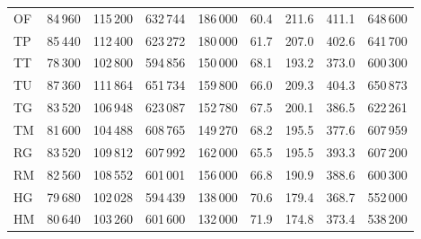 \begin{minipage}{\textwidth}
\begin{tabular*}{\textwidth}{@{\extracolsep{\fill}}lrrrrrrrr@{}}
OF & 84\,960 & 115\,200 & 632\,744 & 186\,000 & 60.4 & 211.6 & 411.1 & 648\,600\\
TP & 85\,440 & 112\,400 & 623\,272 & 180\,000 & 61.7 & 207.0 & 402.6 & 641\,700\\
TT & 78\,300 & 102\,800 & 594\,856 & 150\,000 & 68.1 & 193.2 & 373.0 & 600\,300\\
TU & 87\,360 & 111\,864 & 651\,734 & 159\,800 & 66.0 & 209.3 & 404.3 & 650\,873\\
TG & 83\,520 & 106\,948 & 623\,087 & 152\,780 & 67.5 & 200.1 & 386.5 & 622\,261\\
TM & 81\,600 & 104\,488 & 608\,765 & 149\,270 & 68.2 & 195.5 & 377.6 & 607\,959\\
RG & 83\,520 & 109\,812 & 607\,992 & 162\,000 & 65.5 & 195.5 & 393.3 & 607\,200\\
RM & 82\,560 & 108\,552 & 601\,001 & 156\,000 & 66.8 & 190.9 & 388.6 & 600\,300\\
HG & 79\,680 & 102\,028 & 594\,439 & 138\,000 & 70.6 & 179.4 & 368.7 & 552\,000\\
HM & 80\,640 & 103\,260 & 601\,600 & 132\,000 & 71.9 & 174.8 & 373.4 & 538\,200\\
\bottomrule\end{tabular*}
\end{minipage}\par\medskip
